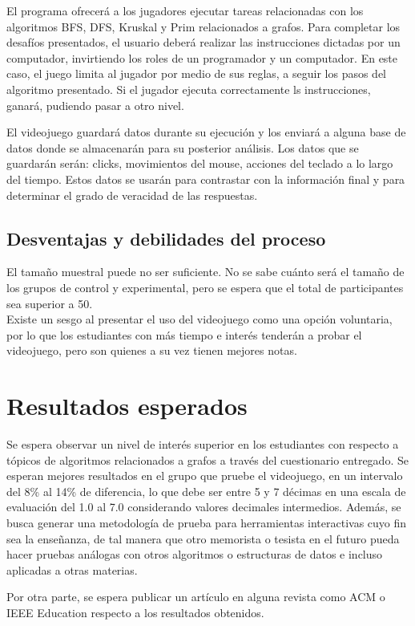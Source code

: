 \documentclass[submission]{eptcs}
\begin{document}
El programa ofrecerá a los jugadores ejecutar tareas relacionadas con los algoritmos BFS, DFS, Kruskal y Prim relacionados a grafos.
Para completar los desafíos presentados, el usuario deberá realizar las instrucciones dictadas por un computador, invirtiendo los roles
de un programador y un computador. En este caso, el juego limita al jugador por medio de sus reglas, a seguir los pasos del algoritmo 
presentado. Si el jugador ejecuta correctamente ls instrucciones, ganará, pudiendo pasar a otro nivel.

El videojuego guardará datos durante su ejecución y los enviará a alguna base de datos donde se almacenarán para su posterior
análisis. Los datos que se guardarán serán: clicks, movimientos del mouse, acciones del teclado a lo largo del tiempo.
Estos datos se usarán para contrastar con la información final y para determinar el grado de veracidad de las respuestas.


\subsection{Desventajas y debilidades del proceso}

El tamaño muestral puede no ser suficiente. No se sabe cuánto será el tamaño de los grupos de control
y experimental, pero se espera que el total de participantes sea superior a 50. \\
Existe un sesgo al presentar el uso del videojuego como una opción voluntaria, por lo que los estudiantes
con más tiempo e interés tenderán a probar el videojuego, pero son quienes a su vez tienen mejores notas. \\


\section{Resultados esperados}


Se espera observar un nivel de interés superior en los estudiantes con respecto a tópicos de algoritmos
relacionados a grafos a través del cuestionario entregado.
Se esperan mejores resultados en el grupo que pruebe el videojuego, en un intervalo del
8\% al 14\% de diferencia, lo que debe ser entre 5 y 7 décimas en una escala de evaluación del 1.0 al 7.0
considerando valores decimales intermedios.
Además, se busca generar una metodología de prueba para herramientas interactivas cuyo fin sea la enseñanza,
de tal manera que otro memorista o tesista en el futuro pueda hacer pruebas análogas con otros algoritmos
o estructuras de datos e incluso aplicadas a otras materias.

Por otra parte, se espera publicar un artículo en alguna revista
como ACM o IEEE Education respecto a los resultados obtenidos.


\nocite{*}


\end{document}
